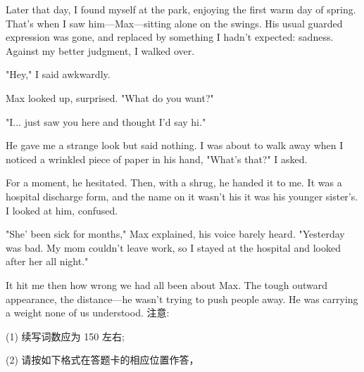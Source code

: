 \documentclass{英语试卷}
\begin{document}
\par Later that day, I found myself at the park, enjoying the first warm day of spring. That's when I saw him—Max—sitting alone on the swings. His usual guarded expression was gone, and replaced by something I hadn't expected: sadness. Against my better judgment, I walked over.\par
\par "Hey," I said awkwardly.\par
\par Max looked up, surprised. "What do you want?"\par
\par "I... just saw you here and thought I'd say hi."\par
\par He gave me a strange look but said nothing. I was about to walk away when I noticed a wrinkled piece of paper in his hand, "What's that?" I asked.\par
\par For a moment, he hesitated. Then, with a shrug, he handed it to me. It was a hospital discharge form, and the name on it wasn't his it was his younger sister's. I looked at him, confused.\par
\par "She' been sick for months," Max explained, his voice barely heard. "Yesterday was bad. My mom couldn't leave work, so I stayed at the hospital and looked after her all night."\par
\par It hit me then how wrong we had all been about Max. The tough outward appearance, the distance—he wasn't trying to push people away. He was carrying a weight none of us understood. 注意:\par
\par (1) 续写词数应为 150 左右;\par
\par (2) 请按如下格式在答题卡的相应位置作答，\par
{}
\end{document}
